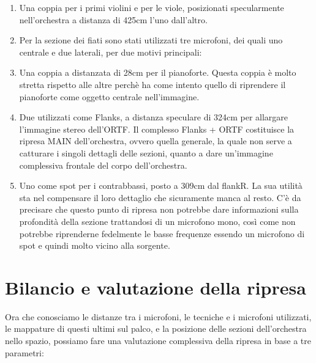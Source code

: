 \begin{enumerate}
\item Una coppia per i primi violini e per le viole, posizionati specularmente nell'orchestra a distanza di 425cm l'uno dall'altro.

\item Per la sezione dei fiati sono stati utilizzati tre microfoni, dei quali uno centrale e due laterali, per due motivi principali:

\item Una coppia a distanzata di 28cm per il pianoforte. Questa coppia è molto stretta rispetto alle altre perchè ha come intento quello di riprendere il pianoforte come oggetto centrale nell'immagine.

\item Due utilizzati come Flanks, a distanza speculare di 324cm per allargare l'immagine stereo dell'ORTF. Il complesso Flanks + ORTF costituisce la ripresa MAIN dell'orchestra, ovvero quella generale, la quale non serve a catturare i singoli dettagli delle sezioni, quanto a dare un'immagine complessiva frontale del corpo dell'orchestra.

\item Uno come spot per i contrabbassi, posto a 309cm dal flankR. La sua utilità sta nel compensare il loro dettaglio che sicuramente manca al resto. C'è da precisare che questo punto di ripresa non potrebbe dare informazioni sulla profondità della sezione trattandosi di un microfono mono, così come non potrebbe riprenderne fedelmente le basse frequenze essendo un microfono di spot e quindi molto vicino alla sorgente.
\end{enumerate}

\section*{Bilancio e valutazione della ripresa}
Ora che conosciamo le distanze tra i microfoni, le tecniche e i microfoni utilizzati, le mappature di questi ultimi sul palco, e la posizione delle sezioni dell'orchestra nello spazio, possiamo fare una valutazione complessiva della ripresa in base a tre parametri:

